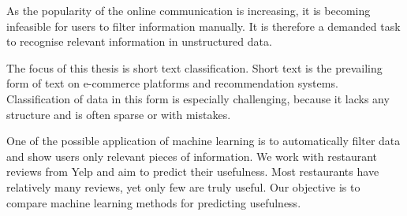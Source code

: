 \documentclass[12pt]{report}
\begin{document}

As the popularity of the online communication is increasing,
it is becoming infeasible for users to filter information manually.
It is therefore a demanded task to recognise relevant information in unstructured data.

The focus of this thesis is short text classification.
Short text is the prevailing form of text on e-commerce platforms and recommendation systems.
Classification of data in this form is especially challenging, because it lacks any structure
and is often sparse or with mistakes.

One of the possible application of machine learning is to automatically filter data
and show users only relevant pieces of information.
We work with restaurant reviews from Yelp and aim to predict their usefulness.
Most restaurants have relatively many reviews, yet only few are truly useful.
Our objective is to compare machine learning methods for predicting usefulness.
\end{document}
